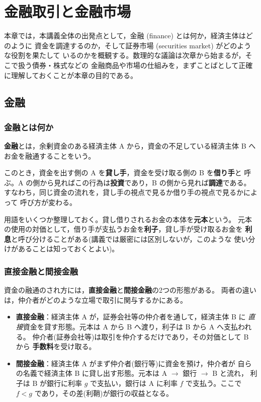 \chapter{金融取引と金融市場}

本章では，本講義全体の出発点として，金融 (finance) とは何か，経済主体はどのように
資金を調達するのか，そして証券市場 (securities market) がどのような役割を果たして
いるのかを概観する。数理的な議論は次章から始まるが，そこで扱う債券・株式などの
金融商品や市場の仕組みを，まずことばとして正確に理解しておくことが本章の目的である。

\section{金融}

\subsection{金融とは何か}

\begin{definition}[金融]
\textbf{金融}とは，余剰資金のある経済主体 A から，資金の不足している経済主体 B へ
お金を融通することをいう。
\end{definition}

このとき，資金を出す側の A を\textbf{貸し手}，資金を受け取る側の B を\textbf{借り手}と
呼ぶ。A の側から見ればこの行為は\textbf{投資}であり，B の側から見れば\textbf{調達}である。
すなわち，同じ資金の流れを，貸し手の視点で見るか借り手の視点で見るかによって
呼び方が変わる。

用語をいくつか整理しておく。貸し借りされるお金の本体を\textbf{元本}という。
元本の使用の対価として，借り手が支払うお金を\textbf{利子}，貸し手が受け取るお金を
\textbf{利息}と呼び分けることがある(講義では厳密には区別しないが，このような
使い分けがあることは知っておくとよい)。

\subsection{直接金融と間接金融}

資金の融通のされ方には，\textbf{直接金融}と\textbf{間接金融}の2つの形態がある。
両者の違いは，仲介者がどのような立場で取引に関与するかにある。

\begin{itemize}
\item \textbf{直接金融}：経済主体 A が，証券会社等の仲介者を通して，経済主体 B に
\emph{直接}資金を貸す形態。元本は A から B へ渡り，利子は B から A へ支払われる。
仲介者(証券会社等)は取引を仲介するだけであり，その対価として B から
\textbf{手数料}を受け取る。
\item \textbf{間接金融}：経済主体 A がまず仲介者(銀行等)に資金を預け，仲介者が
自らの名義で経済主体 B に貸し出す形態。元本は A $\to$ 銀行 $\to$ B と流れ，
利子は B が銀行に利率 $g$ で支払い，銀行は A に利率 $f$ で支払う。ここで
$f < g$ であり，その差(利鞘)が銀行の収益となる。
\end{itemize}

